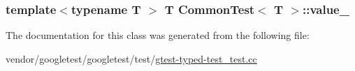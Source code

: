 \subsubsection[{\texorpdfstring{value\+\_\+}{value_}}]{\setlength{\rightskip}{0pt plus 5cm}template$<$typename T $>$ T {\bf Common\+Test}$<$ T $>$\+::value\+\_\+\hspace{0.3cm}{\ttfamily [protected]}}\hypertarget{classCommonTest_ae59c4abcb833625a7baeb2048531ebec}{}\label{classCommonTest_ae59c4abcb833625a7baeb2048531ebec}


The documentation for this class was generated from the following file\+:\begin{DoxyCompactItemize}
\item 
vendor/googletest/googletest/test/\hyperlink{gtest-typed-test__test_8cc}{gtest-\/typed-\/test\+\_\+test.\+cc}\end{DoxyCompactItemize}
